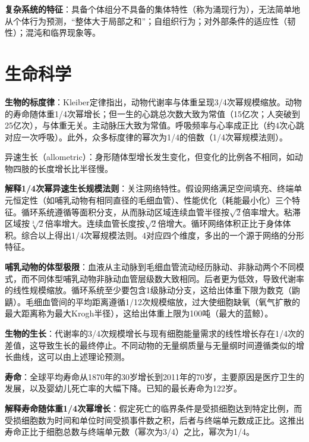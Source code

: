 \par \textbf{复杂系统的特征}：具备个体组分不具备的集体特性（称为涌现行为），无法简单地从个体行为预测，“整体大于局部之和”；自组织行为；对外部条件的适应性（韧性）；混沌和临界现象等。

\section{生命科学}

\par \textbf{生物的标度律}：Kleiber定律指出，动物代谢率与体重呈现3/4次幂规模缩放。动物的寿命随体重1/4次幂增长；但一生的心跳总次数大致为常值（15亿次；人突破到25亿次），与体重无关。主动脉压大致为常值。呼吸频率与心率成正比（约4次心跳对应一次呼吸）。此外，众多标度律的幂次为1/4的倍数（1/4次幂规模法则）。

\par 异速生长（allometric）：身形随体型增长发生变化，但变化的比例各不相同，如动物四肢的长度增长比半径慢。

\par \textbf{解释1/4次幂异速生长规模法则}：关注网络特性。假设网络满足空间填充、终端单元恒定性（如哺乳动物有相同直径的毛细血管）、性能优化（耗能最小化）三个特征。循环系统遵循等面积分支，从而脉动区域连续血管半径按$\sqrt{2}$倍率增大。粘滞区域按$\sqrt[3]{2}$倍率增大。连续血管长度按$\sqrt{2}$倍增大。循环网络体积正比于身体体积。综合以上得出1/4次幂规模法则。4对应四个维度，多出的一个源于网络的分形特征。

\par \textbf{哺乳动物的体型极限}：血液从主动脉到毛细血管流动经历脉动、非脉动两个不同模式，而不同体型哺乳动物非脉动血管层级数大致相同。后者更为低效，导致代谢率的线性规模缩放。循环系统至少要包含1级脉动分支，这给出体重下限为数克（鼩鼱）。毛细血管间的平均距离遵循1/12次规模缩放，过大使细胞缺氧（氧气扩散的最大距离称为最大Krogh半径），这给出体重上限为100吨（最大的蓝鲸）。

\par \textbf{生物的生长}：代谢率的3/4次规模增长与现有细胞能量需求的线性增长存在1/4次的差值，这导致生长的最终停止。不同动物的无量纲质量与无量纲时间遵循类似的增长曲线，这可以由上述理论预测。

\par \textbf{寿命}：全球平均寿命从1870年的30岁增长到2011年的70岁，主要原因是医疗卫生的发展，以及婴幼儿死亡率的大幅下降。已知的最长寿命为122岁。

\par \textbf{解释寿命随体重1/4次幂增长}：假定死亡的临界条件是受损细胞达到特定比例，而受损细胞数为时间和单位时间受损事件数之积，后者与终端单元数成正比。这推出寿命正比于细胞总数与终端单元数（幂次为3/4）之比，幂次为1/4。


